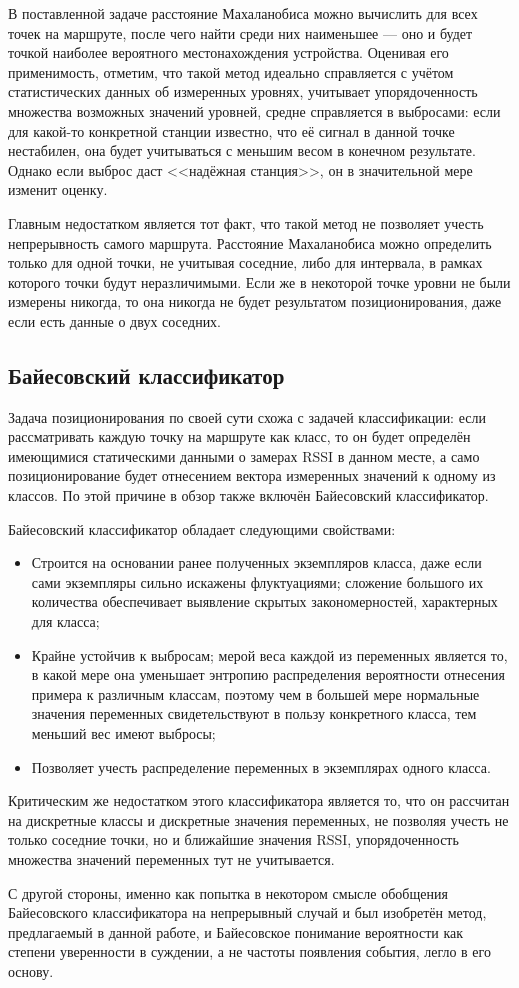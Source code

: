 В поставленной задаче расстояние Махаланобиса можно вычислить для всех точек на маршруте, после чего найти среди них наименьшее --- оно и будет точкой наиболее вероятного местонахождения устройства. Оценивая его применимость, отметим, что такой метод идеально справляется с учётом статистических данных об измеренных уровнях, учитывает упорядоченность множества возможных значений уровней, средне справляется в выбросами: если для какой-то конкретной станции известно, что её сигнал в данной точке нестабилен, она будет учитываться с меньшим весом в конечном результате. Однако если выброс даст <<надёжная станция>>, он в значительной мере изменит оценку.

Главным недостатком является тот факт, что такой метод не позволяет учесть непрерывность самого маршрута. Расстояние Махаланобиса можно определить только для одной точки, не учитывая соседние, либо для интервала, в рамках которого точки будут неразличимыми. Если же в некоторой точке уровни не были измерены никогда, то она никогда не будет результатом позиционирования, даже если есть данные о двух соседних.

\subsection{Байесовский классификатор}
\label{subsec:bayes}
Задача позиционирования по своей сути схожа с задачей классификации: если рассматривать каждую точку на маршруте как класс, то он будет определён имеющимися статическими данными о замерах RSSI в данном месте, а само позиционирование будет отнесением вектора измеренных значений к одному из классов. По этой причине в обзор также включён Байесовский классификатор.

Байесовский классификатор обладает следующими свойствами\cite{akinator}:
\begin{itemize}
	\item
		Строится на основании ранее полученных экземпляров класса, даже если сами экземпляры сильно искажены флуктуациями; сложение большого их количества обеспечивает выявление скрытых закономерностей, характерных для класса;
	\item
		Крайне устойчив к выбросам; мерой веса каждой из переменных является то, в какой мере она уменьшает энтропию распределения вероятности отнесения примера к различным классам, поэтому чем в большей мере нормальные значения переменных свидетельствуют в пользу конкретного класса, тем меньший вес имеют выбросы;
	\item
		Позволяет учесть распределение переменных в экземплярах одного класса.
\end{itemize}

Критическим же недостатком этого классификатора является то, что он рассчитан на дискретные классы и дискретные значения переменных, не позволяя учесть не только соседние точки, но и ближайшие значения RSSI, упорядоченность множества значений переменных тут не учитывается.

С другой стороны, именно как попытка в некотором смысле обобщения Байесовского классификатора на непрерывный случай и был изобретён метод, предлагаемый в данной работе, и Байесовское понимание вероятности как степени уверенности в суждении, а не частоты появления события, легло в его основу.


